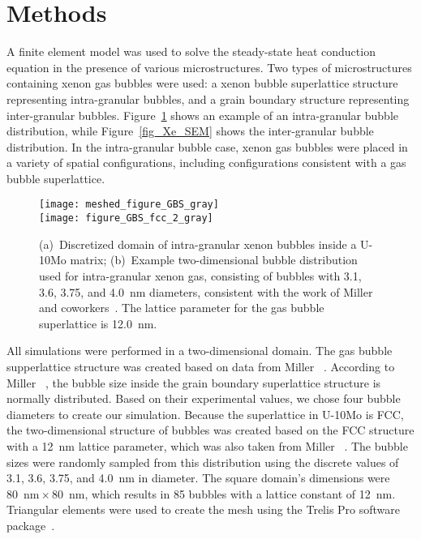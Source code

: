 \section{Methods} \label{sec:Methodology}
A finite element model was used to solve the steady-state heat conduction equation in the presence of various microstructures. Two types of microstructures containing xenon gas bubbles were used: a xenon bubble superlattice structure representing intra-granular bubbles, and a grain boundary structure representing inter-granular bubbles. Figure~\ref{gbs} shows an example of an intra-granular bubble distribution, while Figure~\ref{fig_Xe_SEM} shows the inter-granular bubble distribution.
In the intra-granular bubble case, xenon gas bubbles were placed in a variety
of spatial configurations, including configurations consistent with a gas bubble superlattice.
\begin{figure}%
    \centering
	  \texttt{[image: meshed\_figure\_GBS\_gray]}
    \\
	 \texttt{[image: figure\_GBS\_fcc\_2\_gray]}
	\caption[(a)~Discretized domain of intra-granular xenon bubbles inside a U-10Mo matrix; (b)~Example two-dimensional bubble distribution 
used for intra-granular xenon gas, consisting of bubbles with 3.1, 3.6, 3.75,
        and 4.0~nm diameters, consistent with the work of Miller and
        coworkers]{(a)~Discretized domain of intra-granular xenon bubbles inside a U-10Mo matrix; (b)~Example two-dimensional bubble distribution 
used for intra-granular xenon gas, consisting of bubbles with 3.1, 3.6, 3.75,
        and 4.0~nm diameters, consistent with the work of Miller and
        coworkers~\cite{miller2015transmission}. The lattice parameter for the
        gas bubble superlattice is 12.0~nm.}
	\label{gbs}
\end{figure}
All simulations were performed in a two-dimensional domain. The gas bubble supperlattice structure was created based on data from Miller \etal~\cite{miller2015transmission}. According to Miller \etal~\cite{miller2015transmission}, the bubble size inside the grain boundary superlattice structure is normally distributed. Based on their experimental values, we chose four bubble diameters to create our simulation. Because the superlattice in U-10Mo is FCC, the two-dimensional structure of bubbles was created based on the FCC structure with a 12~nm lattice parameter, which was also taken from Miller \etal~\cite{miller2015transmission}. The bubble sizes were randomly sampled from this distribution using the discrete values of 3.1, 3.6, 3.75, and 4.0~nm in diameter. The square domain's dimensions were 80~nm${}\times{}$80~nm, which results in 85 bubbles with a lattice constant of 12~nm. Triangular elements were used to create the mesh using the Trelis Pro software package~\cite{trelis}.

